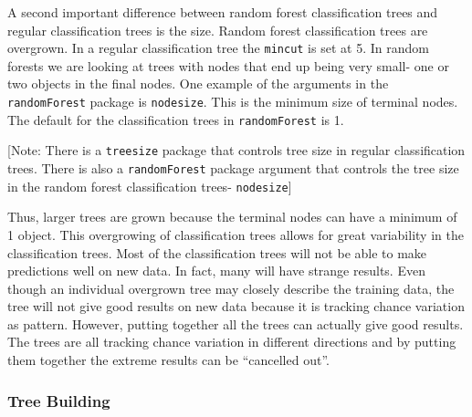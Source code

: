 \documentclass[12pt,twoside]{reedthesis}
\begin{document}
  A second important difference between random forest classification trees
  and regular classification trees is the size. Random forest
  classification trees are overgrown. In a regular classification tree the
  \texttt{mincut} is set at 5. In random forests we are looking at trees
  with nodes that end up being very small- one or two objects in the final
  nodes. One example of the arguments in the \texttt{randomForest} package
  is \texttt{nodesize}. This is the minimum size of terminal nodes. The
  default for the classification trees in \texttt{randomForest} is 1.
  
  {[}Note: There is a \texttt{treesize} package that controls tree size in
  regular classification trees. There is also a \texttt{randomForest}
  package argument that controls the tree size in the random forest
  classification trees- \texttt{nodesize}{]}
  
  Thus, larger trees are grown because the terminal nodes can have a
  minimum of 1 object. This overgrowing of classification trees allows for
  great variability in the classification trees. Most of the
  classification trees will not be able to make predictions well on new
  data. In fact, many will have strange results. Even though an individual
  overgrown tree may closely describe the training data, the tree will not
  give good results on new data because it is tracking chance variation as
  pattern. However, putting together all the trees can actually give good
  results. The trees are all tracking chance variation in different
  directions and by putting them together the extreme results can be
  ``cancelled out''.
  
  \subsubsection{Tree Building}\label{tree-building}
  
\end{document}
